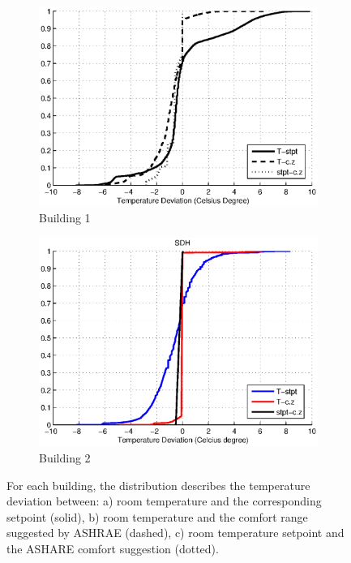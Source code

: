 \begin{figure}[h!]
\centering
	\begin{subfigure}{0.48\textwidth}
                \centering
		\includegraphics[width=\textwidth]{./figs/Soda_new.eps}
                \caption{Building 1}
	\end{subfigure}
	\begin{subfigure}{0.48\textwidth}
                \centering
		\includegraphics[width=\textwidth]{./figs/SDH_new.eps}
                \caption{Building 2}
	\end{subfigure}
\caption{For each building, the distribution describes the temperature deviation between: a) room temperature and the corresponding setpoint (solid), b) room temperature and the comfort range suggested by ASHRAE (dashed), c) room temperature setpoint and the ASHARE comfort suggestion (dotted).}
\label{fig:cdf_temp}
\end{figure}

